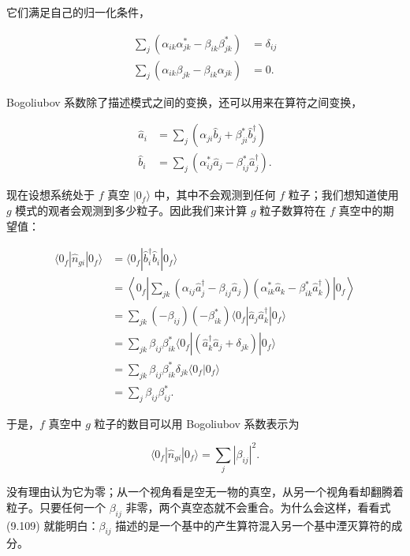 它们满足自己的归一化条件，

\begin{align*}
\sum_j\left(\alpha_{ik}\alpha^{*}_{jk} - \beta_{ik}\beta^{*}_{jk}\right) &= \delta_{ij} \\
\sum_j\left(\alpha_{ik}\beta_{jk} - \beta_{ik}\alpha_{jk}\right) &= 0.
\tag{9.108}
\end{align*}

Bogoliubov 系数除了描述模式之间的变换，还可以用来在算符之间变换，

\begin{align*}
\hat{a}_i &= \sum_j\left(\alpha_{ji}\hat{b}_j + \beta^{*}_{ji}\hat{b}^{\dagger}_j\right) \\
\hat{b}_i &= \sum_j\left(\alpha^{*}_{ij}\hat{a}_j - \beta^{*}_{ij}\hat{a}^{\dagger}_j\right).
\tag{9.109}
\end{align*}

现在设想系统处于 $f$ 真空 $|0_f\rangle$ 中，其中不会观测到任何 $f$ 粒子；我们想知道使用 $g$ 模式的观者会观测到多少粒子。因此我们来计算 $g$ 粒子数算符在 $f$ 真空中的期望值：

\begin{align*}
\langle 0_f|\hat{n}_{gi}|0_f\rangle &= \langle 0_f|\hat{b}^{\dagger}_i\hat{b}_i|0_f\rangle \\
&= \left\langle 0_f\left|\sum_{jk}\left(\alpha_{ij}\hat{a}^{\dagger}_j - \beta_{ij}\hat{a}_j\right)\left(\alpha^{*}_{ik}\hat{a}_k - \beta^{*}_{ik}\hat{a}^{\dagger}_k\right)\right|0_f\right\rangle \\
&= \sum_{jk}\left(-\beta_{ij}\right)\left(-\beta^{*}_{ik}\right)\langle 0_f|\hat{a}_j\hat{a}^{\dagger}_k|0_f\rangle \\
&= \sum_{jk}\beta_{ij}\beta^{*}_{ik}\langle 0_f|\left(\hat{a}^{\dagger}_k\hat{a}_j + \delta_{jk}\right)|0_f\rangle \\
&= \sum_{jk}\beta_{ij}\beta^{*}_{ik}\delta_{jk}\langle 0_f|0_f\rangle \\
&= \sum_j\beta_{ij}\beta^{*}_{ij}.
\tag{9.110}
\end{align*}

于是，$f$ 真空中 $g$ 粒子的数目可以用 Bogoliubov 系数表示为

\begin{equation*}
\langle 0_f|\hat{n}_{gi}|0_f\rangle = \sum_j|\beta_{ij}|^2.
\tag{9.111}
\end{equation*}

没有理由认为它为零；从一个视角看是空无一物的真空，从另一个视角看却翻腾着粒子。只要任何一个 $\beta_{ij}$ 非零，两个真空态就不会重合。为什么会这样，看看式 (9.109) 就能明白：$\beta_{ij}$ 描述的是一个基中的产生算符混入另一个基中湮灭算符的成分。

